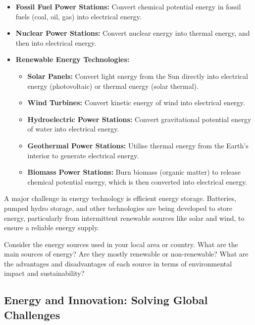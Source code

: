 \begin{marginnote}
\begin{itemize}
    \item \textbf{Fossil Fuel Power Stations:}  Convert chemical potential energy in fossil fuels (coal, oil, gas) into electrical energy.
    \item \textbf{Nuclear Power Stations:} Convert nuclear energy into thermal energy, and then into electrical energy.
    \item \textbf{Renewable Energy Technologies:}
        \begin{itemize}
            \item \textbf{Solar Panels:} Convert light energy from the Sun directly into electrical energy (photovoltaic) or thermal energy (solar thermal).
            \item \textbf{Wind Turbines:} Convert kinetic energy of wind into electrical energy.
            \item \textbf{Hydroelectric Power Stations:} Convert gravitational potential energy of water into electrical energy.
            \item \textbf{Geothermal Power Stations:}  Utilise thermal energy from the Earth's interior to generate electrical energy.
            \item \textbf{Biomass Power Stations:} Burn biomass (organic matter) to release chemical potential energy, which is then converted into electrical energy.
        \end{itemize}
\end{itemize}

\begin{marginnote}
A major challenge in energy technology is efficient energy storage.  Batteries, pumped hydro storage, and other technologies are being developed to store energy, particularly from intermittent renewable sources like solar and wind, to ensure a reliable energy supply.
\end{marginnote}

\begin{stopandthink}
Consider the energy sources used in your local area or country.  What are the main sources of energy? Are they mostly renewable or non-renewable? What are the advantages and disadvantages of each source in terms of environmental impact and sustainability?
\end{stopandthink}


\subsection{Energy and Innovation: Solving Global Challenges}


\end{marginnote}
